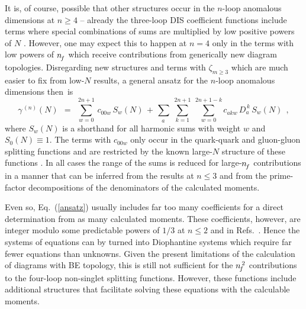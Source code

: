 \documentclass[12pt]{article}
\newcommand{\beq}{\begin{equation}}
\newcommand{\eeq}{\end{equation}}
\begin{document}
It is, of course, possible that other structures occur in the $n$-loop 
anomalous dimensions at $n \geq 4$ -- already the three-loop DIS coefficient 
functions include terms where special combinations of sums are multiplied by
low positive powers of $N$ \cite{mvvF2L,mvvF3}. 
However, one may expect this to happen at $n=4$ only in the terms with low 
powers of ${n^{}_{\! f}}$ which receive contributions from generically new diagram 
topologies. 
Disregarding new structures and terms with $\zeta_{m \geq 3}$ which are much 
easier to fix from low-$N$ results, a general ansatz for the $n$-loop 
anomalous dimensions then~is
%
\beq
\label{ansatz}
  \gamma^{\,(n)}(N) \:\: = \:\: 
  \sum_{w=0}^{2n+1} \, c_{00w}^{}\, S_w(N) \,+\, 
  \sum_{\;a^{\phantom{a}}} \: \sum_{k=1}^{2n+1} \: \sum_{w=0}^{2n+1-k}
  c_{akw}^{}\, D_a^{\,k}\, S_w(N)
\:\: ,
\eeq
%
where $S_w(N)$ is a shorthand for all harmonic sums with weight $w$ and 
$S_0(N) \equiv 1$. The terms with $c_{00w}^{}$ only occur in the quark-quark
and gluon-gluon splitting functions and are restricted by the known 
large-$N$ structure of these functions \cite{PvsCusp,AlbinoBall,DMS05}. 
In all cases the range of the sums is reduced for large-${n^{}_{\! f}}$ contributions 
in a manner that can be inferred from the results at $n \leq 3$ and from the
prime-factor decompositions of the denominators of the calculated moments.

Even so, Eq.~(\ref{ansatz}) usually includes far too many coefficients for a 
direct determination from as many calculated moments. These coefficients, 
however, are integer modulo some predictable powers of $1/3$ at $n \leq 2$ 
\cite{mvvPns,mvvPsg} and in Refs.~\cite{LargeNf1,LargeNf2,LargeNf3}.
Hence the systems of equations can by turned into Diophantine systems which 
require far fewer equations than unknowns.
Given the present limitations of the calculation of diagrams with BE topology,
this is still not sufficient for the ${n^{\,2}_{\! f}}$ contributions to the four-loop
non-singlet splitting functions. However, these functions include additional 
structures that facilitate solving these equations with the calculable moments.
\end{document}

